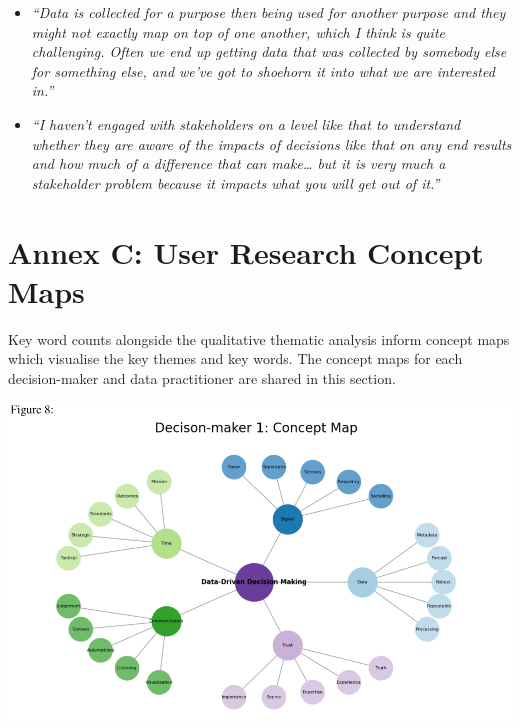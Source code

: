 \documentclass{article}
\begin{document}
\begin{itemize}
{  dependent on the personality of who you're dealing with at the time
  and what they're willing to kind of expose of their own understanding
  and lack of understanding or motivation.''}
\item
  \emph{``Data is collected for a purpose then being used for another
  purpose and they might not exactly map on top of one another, which I
  think is quite challenging. Often we end up getting data that was
  collected by somebody else for something else, and we've got to
  shoehorn it into what we are interested in.''}
\item
  \emph{``I haven't engaged with stakeholders on a level like that to
  understand whether they are aware of the impacts of decisions like
  that on any end results and how much of a difference that can
  make\ldots{} but it is very much a stakeholder problem because it
  impacts what you will get out of it.''}
\end{itemize}

\newpage

\hypertarget{annex-c-user-research-concept-maps}{%
\section{Annex C: User Research Concept
Maps}\label{annex-c-user-research-concept-maps}}

\vspace{-0.4cm}

Key word counts alongside the qualitative thematic analysis inform
concept maps which visualise the key themes and key words. The concept
maps for each decision-maker and data practitioner are shared in this
section.

\includegraphics{210431461_CSC8639_Dissertation_files/figure-latex/unnamed-chunk-4-1.pdf}
\end{document}
